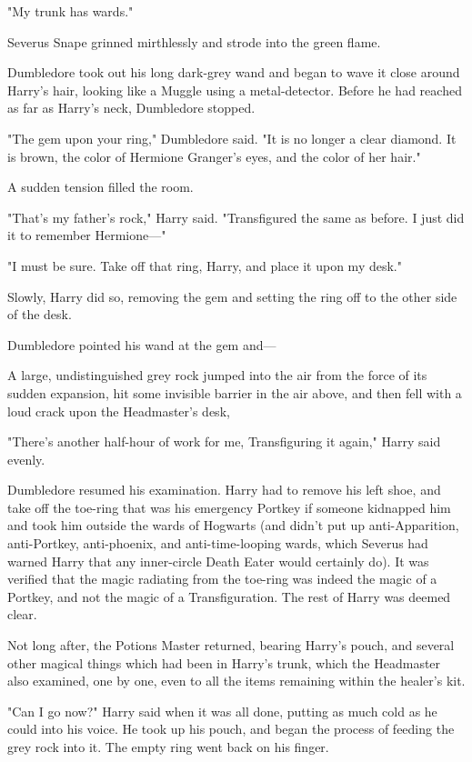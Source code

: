"My trunk has wards."

Severus Snape grinned mirthlessly and strode into the green flame.

Dumbledore took out his long dark-grey wand and began to wave it close around
Harry's hair, looking like a Muggle using a metal-detector. Before he had
reached as far as Harry's neck, Dumbledore stopped.

"The gem upon your ring," Dumbledore said. "It is no longer a clear diamond. It
is brown, the color of Hermione Granger's eyes, and the color of her hair."

A sudden tension filled the room.

"That's my father's rock," Harry said. "Transfigured the same as before. I just
did it to remember Hermione\mbox{---}"

"I must be sure. Take off that ring, Harry, and place it upon my desk."

Slowly, Harry did so, removing the gem and setting the ring off to the other
side of the desk.

Dumbledore pointed his wand at the gem and---

A large, undistinguished grey rock jumped into the air from the force of its
sudden expansion, hit some invisible barrier in the air above, and then fell
with a loud crack upon the Headmaster's desk,

"There's another half-hour of work for me, Transfiguring it again," Harry said
evenly.

Dumbledore resumed his examination. Harry had to remove his left shoe, and take
off the toe-ring that was his emergency Portkey if someone kidnapped him and
took him outside the wards of Hogwarts (and didn't put up anti-Apparition,
anti-Portkey, anti-phoenix, and anti-time-looping wards, which Severus had
warned Harry that any inner-circle Death Eater would certainly do). It was
verified that the magic radiating from the toe-ring was indeed the magic of a
Portkey, and not the magic of a Transfiguration. The rest of Harry was deemed
clear.

Not long after, the Potions Master returned, bearing Harry's pouch, and several
other magical things which had been in Harry's trunk, which the Headmaster also
examined, one by one, even to all the items remaining within the healer's kit.

"Can I go now?" Harry said when it was all done, putting as much cold as he
could into his voice. He took up his pouch, and began the process of feeding
the grey rock into it. The empty ring went back on his finger.

